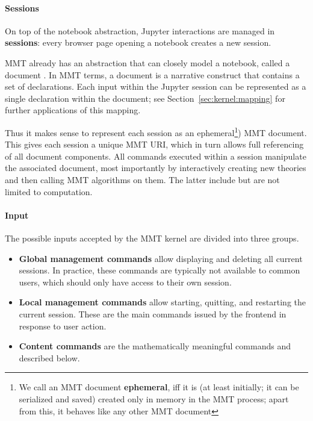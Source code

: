 \paragraph{Sessions}
On top of the notebook abstraction, Jupyter interactions are managed in \textbf{sessions}: every browser page opening a notebook creates a new session.

MMT already has an abstraction that can closely model a notebook, called a document . 
In MMT terms, a document is a narrative construct that contains a set of declarations. 
Each input within the Jupyter session can be represented as a single declaration within the document; see Section~\ref{sec:kernel:mapping} for further applications of this mapping. 

Thus it makes sense to represent each session as an ephemeral\footnote{We call an MMT document \textbf{ephemeral}, iff it is (at least initially; it can be serialized and saved) created only in memory in the MMT process; apart from this, it behaves like any other MMT document}) MMT document. 
This gives each session a unique MMT URI, which in turn allows full referencing of all document components.
All commands executed within a session manipulate the associated document, most importantly by interactively creating new theories and then calling MMT algorithms on them.
The latter include but are not limited to computation.

\paragraph{Input}
The possible inputs accepted by the MMT kernel are divided into three groups.
\begin{itemize}
\item \textbf{Global management commands} allow displaying and deleting all current sessions.
 In practice, these commands are typically not available to common users, which should only have access to their own session.
\item \textbf{Local management commands} allow starting, quitting, and restarting the current session. These are the main commands issued by the frontend in response to user action.
\item \textbf{Content commands} are the mathematically meaningful commands and described below.
\end{itemize}

